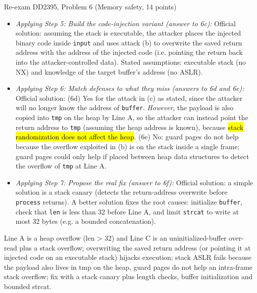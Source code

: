 \documentclass[12pt, a4paper]{article}
\newcommand{\imp}[1]{\hl{#1}}                       %
\begin{document}
\begin{practicebox}{Re-exam DD2395, Problem 6 (Memory safety, 14 points)}
\begin{itemize}
    The attacker supplies \texttt{input} such that \texttt{strcat(buffer, input)} writes beyond the 32-byte buffer (region corrupted: the \emph{stack}).

    The overflow overwrites the saved frame pointer and the saved return address of \texttt{process}'s frame (state overwritten).

    The attacker writes an address of their choosing, e.g. an existing function, over the saved return address; when \texttt{process} returns, the CPU jumps to that attacker-chosen address (redirection).
    \item \textit{Applying Step 5: Build the code-injection variant (answer to 6c):} Official solution: assuming the stack is executable, the attacker places the injected binary code inside \texttt{input} and uses attack (b) to overwrite the saved return address with the address of the injected code (i.e. pointing the return back into the attacker-controlled data). Stated assumptions: executable stack (no NX) and knowledge of the target buffer's address (no ASLR).
    \item \textit{Applying Step 6: Match defenses to what they miss (answers to 6d and 6e):} Official solution: (6d) Yes for the attack in (c) as stated, since the attacker will no longer know the address of \texttt{buffer}.
    \emph{However}, the payload is also copied into \texttt{tmp} on the heap by Line A, so the attacker can instead point the return address to \texttt{tmp} (assuming the heap address is known), because \imp{stack randomization does not affect the heap}. (6e) No: guard pages do not help because the overflow exploited in (b) is on the stack inside a single frame; guard pages could only help if placed between heap data structures to detect the overflow of \texttt{tmp} at Line A.
    \item \textit{Applying Step 7: Propose the real fix (answer to 6f):} Official solution: a simple solution is a stack canary (detects the return-address overwrite before \texttt{process} returns).
    A better solution fixes the root causes: initialize \texttt{buffer}, check that \texttt{len} is less than 32 before Line A, and limit \texttt{strcat} to write at most 32 bytes (e.g. a bounded concatenation).
\end{itemize}

\begin{answerbox}
Line A is a heap overflow (len > 32) and Line C is an uninitialized-buffer over-read plus a stack overflow; overwriting the saved return address (or pointing it at injected code on an executable stack) hijacks execution; stack ASLR fails because the payload also lives in tmp on the heap, guard pages do not help an intra-frame stack overflow; fix with a stack canary plus length checks, buffer initialization and bounded strcat.
\end{answerbox}
\end{practicebox}
\end{document}

